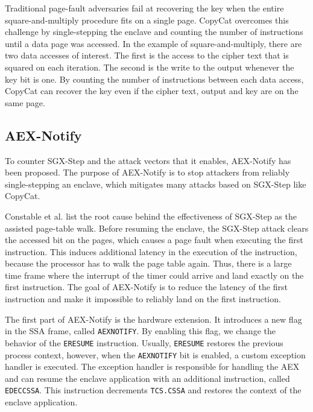 \documentclass{llncs}
\begin{document}
Traditional page-fault adversaries fail at recovering the key when the entire
square-and-multiply procedure fits on a single page.
CopyCat overcomes this challenge by single-stepping the enclave and counting the
number of instructions until a data page was accessed.
In the example of square-and-multiply, there are two data accesses of interest.
The first is the access to the cipher text that is squared on each iteration.
The second is the write to the output whenever the key bit is one.
By counting the number of instructions between each data access,
CopyCat can recover the key even if the cipher text, output and key are on the same page.


\subsection{AEX-Notify}
\label{sec:aex-notify}

To counter SGX-Step and the attack vectors that it enables, AEX-Notify has been proposed.
The purpose of AEX-Notify is to stop attackers from reliably single-stepping an enclave,
which mitigates many attacks based on SGX-Step like CopyCat.

Constable et al. \cite{ConstableBCXXAK23} list the root cause behind the effectiveness of SGX-Step as the assisted page-table walk.
Before resuming the enclave, the SGX-Step attack clears the accessed bit on the pages,
which causes a page fault when executing the first instruction.
This induces additional latency in the execution of the instruction, because
the processor has to walk the page table again.
Thus, there is a large time frame where the interrupt of the timer could
arrive and land exactly on the first instruction.
The goal of AEX-Notify is to reduce the latency of the first instruction
and make it impossible to reliably land on the first instruction.

The first part of AEX-Notify is the hardware extension.
It introduces a new flag in the SSA frame, called \texttt{AEXNOTIFY}.
By enabling this flag, we change the behavior of the \texttt{ERESUME} instruction.
Usually, \texttt{ERESUME} restores the previous process context,
however, when the \texttt{AEXNOTIFY} bit is enabled,
a custom exception handler is executed.
The exception handler is responsible for handling the AEX and
can resume the enclave application with an additional instruction, called \texttt{EDECCSSA}.
This instruction decrements \texttt{TCS.CSSA} and restores the context of the enclave application.
\end{document}
